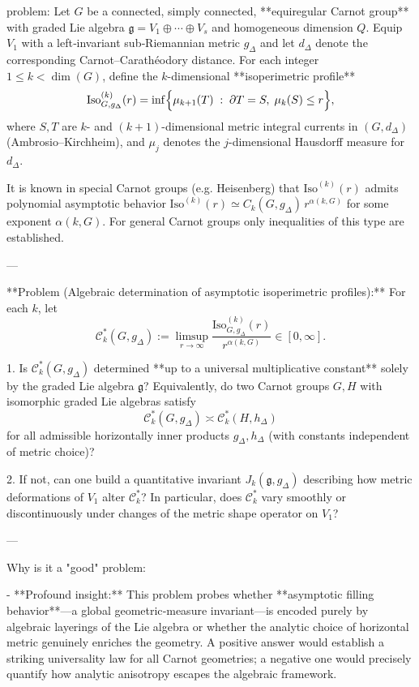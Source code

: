 problem:  
Let \(G\) be a connected, simply connected, **equiregular Carnot group** with graded Lie algebra  
\(\mathfrak g = V_1 \oplus \cdots \oplus V_s\) and homogeneous dimension \(Q\).  
Equip \(V_1\) with a left‑invariant sub‑Riemannian metric \(g_\Delta\) and let \(d_\Delta\) denote the corresponding Carnot–Carathéodory distance.  
For each integer \(1 \le k < \dim(G)\), define the \(k\)-dimensional **isoperimetric profile**  
\[
\mathrm{Iso}_{G,g_\Delta}^{(k)}(r)=
\inf\Bigl\{
\mu_{k+1}(T)\;:\;
\partial T=S,\;
\mu_k(S)\le r
\Bigr\},
\]
where \(S,T\) are \(k\)- and \((k+1)\)-dimensional metric integral currents in \((G,d_\Delta)\) (Ambrosio–Kirchheim),  
and \(\mu_j\) denotes the \(j\)-dimensional Hausdorff measure for \(d_\Delta\).

It is known in special Carnot groups (e.g. Heisenberg) that  
\(\mathrm{Iso}^{(k)}(r)\) admits polynomial asymptotic behavior  
\(\mathrm{Iso}^{(k)}(r)\simeq C_{k}(G,g_\Delta)\, r^{\alpha(k,G)}\)  
for some exponent \(\alpha(k,G)\).  
For general Carnot groups only inequalities of this type are established.

---

**Problem (Algebraic determination of asymptotic isoperimetric profiles):**  
For each \(k\), let  
\[
\mathcal{C}^{*}_k(G,g_\Delta)
:= \limsup_{r\to \infty} \frac{\mathrm{Iso}^{(k)}_{G,g_\Delta}(r)}{r^{\alpha(k,G)}}
\in [0,\infty].
\]

1. Is \(\mathcal{C}^{*}_k(G,g_\Delta)\) determined **up to a universal multiplicative constant** solely by the graded Lie algebra \(\mathfrak g\)?  
   Equivalently, do two Carnot groups \(G,H\) with isomorphic graded Lie algebras satisfy  
   \[
   \mathcal{C}^{*}_k(G,g_\Delta) \asymp \mathcal{C}^{*}_k(H,h_\Delta)
   \]
   for all admissible horizontally inner products \(g_\Delta,h_\Delta\) (with constants independent of metric choice)?  

2. If not, can one build a quantitative invariant \(J_k(\mathfrak g,g_\Delta)\) describing how metric deformations of \(V_1\) alter \(\mathcal{C}^{*}_k\)?  
   In particular, does \(\mathcal{C}^{*}_k\) vary smoothly or discontinuously under changes of the metric shape operator on \(V_1\)?  

---

Why is it a "good" problem:  

- **Profound insight:**  
  This problem probes whether **asymptotic filling behavior**—a global geometric‑measure invariant—is encoded purely by algebraic layerings of the Lie algebra or whether the analytic choice of horizontal metric genuinely enriches the geometry. A positive answer would establish a striking universality law for all Carnot geometries; a negative one would precisely quantify how analytic anisotropy escapes the algebraic framework.

